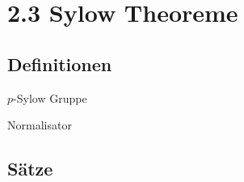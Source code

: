 \documentclass[twocolumn]{report}
\begin{document}
\section*{2.3 Sylow Theoreme}
\subsection*{Definitionen}
\begin{enumerate*}[label=2.\arabic*, itemsep=0pt, topsep=0pt, parsep=0pt, partopsep=0pt, leftmargin=*]
    \item $p$-Sylow Gruppe
    \item Normalisator
\end{enumerate*}

\subsection*{Sätze}
\end{document}
